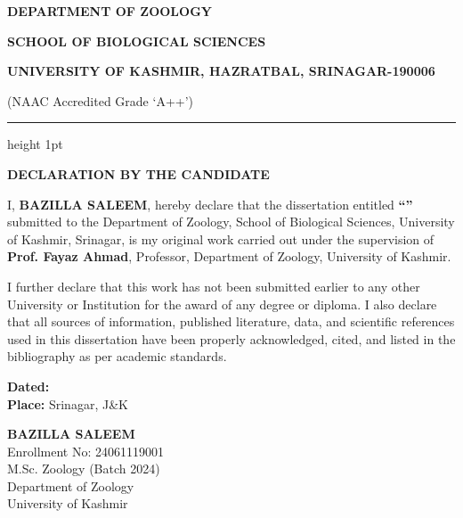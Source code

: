
\clearpage
\thispagestyle{frontmatterstyle}
\begin{center}
{\bfseries DEPARTMENT OF ZOOLOGY\par}
{\bfseries SCHOOL OF BIOLOGICAL SCIENCES\par}
{\bfseries UNIVERSITY OF KASHMIR, HAZRATBAL, SRINAGAR-190006\par}
{\footnotesize (NAAC Accredited Grade `A++')\par}
\vspace{0.15in}
\hrule height 1pt
\vspace{0.3in}
{\Large \bfseries DECLARATION BY THE CANDIDATE\par}
\vspace{0.3in}
\end{center}

\noindent I, \textbf{BAZILLA SALEEM}, hereby declare that the dissertation entitled \textbf{``\distitlecite''} submitted to the Department of Zoology, School of Biological Sciences, University of Kashmir, Srinagar, is my original work carried out under the supervision of \textbf{Prof. Fayaz Ahmad}, Professor, Department of Zoology, University of Kashmir.

\vspace{0.2in}

\noindent I further declare that this work has not been submitted earlier to any other University or Institution for the award of any degree or diploma. I also declare that all sources of information, published literature, data, and scientific references used in this dissertation have been properly acknowledged, cited, and listed in the bibliography as per academic standards.

\vspace{1.2in}

\noindent
\begin{minipage}{0.48\textwidth}
\begin{flushleft}
\textbf{Dated:} \hrulefill\\[0.3in]
\textbf{Place:} Srinagar, J\&K
\end{flushleft}
\end{minipage}
\hfill
\begin{minipage}{0.48\textwidth}
\begin{flushright}
\textbf{BAZILLA SALEEM}\\
Enrollment No: 24061119001\\
M.Sc. Zoology (Batch 2024)\\
Department of Zoology\\
University of Kashmir
\end{flushright}
\end{minipage}
